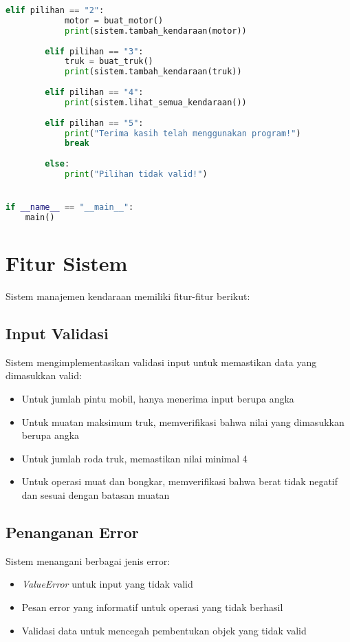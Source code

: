 \documentclass[12pt]{article}
\begin{document}
\begin{lstlisting}[language=Python, caption=Implementasi Fungsi Pembantu dan Program Utama]
        elif pilihan == "2":
            motor = buat_motor()
            print(sistem.tambah_kendaraan(motor))
            
        elif pilihan == "3":
            truk = buat_truk()
            print(sistem.tambah_kendaraan(truk))
            
        elif pilihan == "4":
            print(sistem.lihat_semua_kendaraan())
            
        elif pilihan == "5":
            print("Terima kasih telah menggunakan program!")
            break
            
        else:
            print("Pilihan tidak valid!")


if __name__ == "__main__":
    main()
\end{lstlisting}

\section{Fitur Sistem}

Sistem manajemen kendaraan memiliki fitur-fitur berikut:

\subsection{Input Validasi}
Sistem mengimplementasikan validasi input untuk memastikan data yang dimasukkan valid:
\begin{itemize}
    \item Untuk jumlah pintu mobil, hanya menerima input berupa angka
    \item Untuk muatan maksimum truk, memverifikasi bahwa nilai yang dimasukkan berupa angka
    \item Untuk jumlah roda truk, memastikan nilai minimal 4
    \item Untuk operasi muat dan bongkar, memverifikasi bahwa berat tidak negatif dan sesuai dengan batasan muatan
\end{itemize}

\subsection{Penanganan Error}
Sistem menangani berbagai jenis error:
\begin{itemize}
    \item \textit{ValueError} untuk input yang tidak valid
    \item Pesan error yang informatif untuk operasi yang tidak berhasil
    \item Validasi data untuk mencegah pembentukan objek yang tidak valid
\end{itemize}
\end{document}
